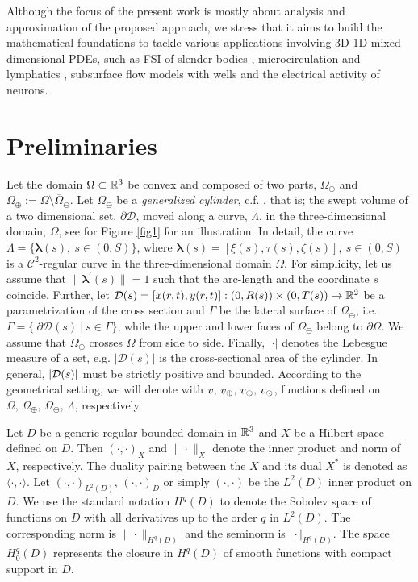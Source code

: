 \documentclass[r]{siamart171218}
\newcommand{\paolo}[1]{{\color{black}#1}}
\begin{document}
\paolo{Although the focus of the present work is mostly about analysis and approximation of the proposed approach, we stress that it aims to build the mathematical foundations to tackle various applications involving 3D-1D mixed dimensional PDEs, such as FSI of slender bodies \cite{Mori2019887}, microcirculation and lymphatics \cite{Possenti2019101,Vinje2019}, subsurface flow models with wells \cite{Cerroni2019} and the electrical activity of neurons.}

\section{Preliminaries}\label{sec:setting}

Let the domain $\Omega\subset \mathbb{R}^3 $ be convex and composed of two parts, 
$\Omega_{\ominus}$ and $\Omega_{\oplus}:=\Omega\setminus\overline{\Omega}_{\ominus}$. 
Let 
$\Omega_{\ominus}$ be a \emph{generalized cylinder}, c.f.  \cite{MR1940257}, 
that is; the swept volume of a two dimensional set, $\partial\mathcal{D}$, moved along a curve, $\Lambda$, in the three-dimensional domain, $\Omega$, see for Figure \ref{fig1} for an illustration. 
In detail, the curve 
$\Lambda = \{\boldsymbol \lambda(s), \ s\in(0,S)\}$,  where 
$\boldsymbol \lambda(s) = [\xi(s), \tau(s), \zeta(s)], \ s\in(0,S)$ is a $\mathcal{C}^2$-regular curve in the three-dimensional domain $\Omega$.
For simplicity, let us assume that $\|\boldsymbol \lambda^\prime(s)\|=1$ such that the arc-length and the coordinate $s$ coincide.
Further, let $\mathcal{D}(s) = [x(r,t),y(r,t)]: (0,R(s))\times(0,T(s)) \rightarrow \mathbb{R}^2$ be a parametrization of the cross section
and $\Gamma$ be the lateral surface of $\Omega_{\ominus}$, i.e.
$\Gamma=\{ \ \partial \mathcal{D}(s) \  | \ s \in \Gamma\}$,
while the upper and lower faces of $\Omega_{\ominus}$ belong to $\partial\Omega$. 
We assume that $\Omega_{\ominus}$ crosses $\Omega$ from side to side.
 \paolo{Finally, $|\cdot|$ denotes the Lebesgue measure of a set, e.g. $|\mathcal{D}(s)|$ is the cross-sectional area of the cylinder. In general, $|\mathcal{D}(s)|$ must be strictly positive and bounded.}
According to the geometrical setting, we will denote with $v,\,v_\oplus,\,v_\ominus,\,v_{\odot}$,
functions defined on $\Omega,\,\Omega_{\oplus},\,\Omega_{\ominus},\,\Lambda$, respectively.

Let $D$ be a generic regular bounded domain in $\mathbb{R}^3$ and $X$ be a Hilbert space defined on $D$. Then  $(\cdot,\cdot)_X$ and $\|\cdot\|_X$ denote the inner product and norm of $X$, respectively.
The duality pairing between the $X$ and its dual $X^*$ is denoted as $\langle\cdot,\cdot\rangle$.
Let $(\cdot,\cdot)_{L^2(D)}$,  $(\cdot,\cdot)_D$ or simply $(\cdot,\cdot)$ be the $L^2(D)$ inner product on $D$.
We use the standard notation $H^q(D)$ to denote the Sobolev space of functions on $D$ with all derivatives up to the order $q$ in $L^2(D)$.
The corresponding norm is $\|\cdot\|_{H^q(D)}$ and the seminorm is $\vert\cdot\vert_{H^q(D)}$.
The space $H^q_0(D)$ represents the closure in $H^q(D)$ of smooth functions with compact support in $D$.
\end{document}
